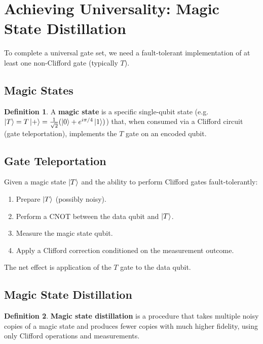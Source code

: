 \documentclass[11pt]{article}
\theoremstyle{definition}
\newtheorem{definition}{Definition}[section]
\begin{document}
\section{Achieving Universality: Magic State Distillation}

To complete a universal gate set, we need a fault-tolerant implementation of at least one non-Clifford gate (typically $T$).

\subsection{Magic States}

\begin{definition}
A \textbf{magic state} is a specific single-qubit state (e.g.\ $\ket{T}=T\ket{+}=\frac{1}{\sqrt{2}}(\ket{0}+e^{i\pi/4}\ket{1})$) that, when consumed via a Clifford circuit (gate teleportation), implements the $T$ gate on an encoded qubit.
\end{definition}

\subsection{Gate Teleportation}

Given a magic state $\ket{T}$ and the ability to perform Clifford gates fault-tolerantly:
\begin{enumerate}
    \item Prepare $\ket{T}$ (possibly noisy).
    \item Perform a CNOT between the data qubit and $\ket{T}$.
    \item Measure the magic state qubit.
    \item Apply a Clifford correction conditioned on the measurement outcome.
\end{enumerate}
The net effect is application of the $T$ gate to the data qubit.

\subsection{Magic State Distillation}

\begin{definition}
\textbf{Magic state distillation} is a procedure that takes multiple noisy copies of a magic state and produces fewer copies with much higher fidelity, using only Clifford operations and measurements.
\end{definition}
\end{document}
